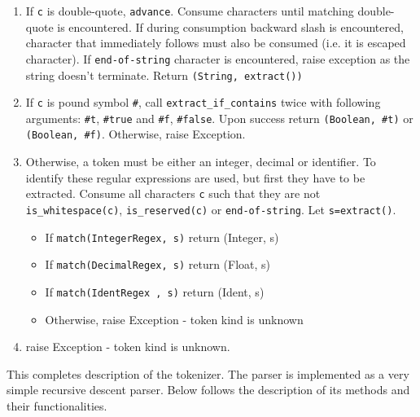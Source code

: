 \begin{itemize}
\begin{enumerate}
	\item
	If \texttt{c} is double-quote, \texttt{advance}. Consume characters until matching double-quote is encountered. If during consumption backward slash is encountered, character that immediately follows must also be consumed (i.e. it is escaped character). If \texttt{end-of-string} character is encountered, raise exception as the string doesn't terminate. Return \texttt{(String, extract())}

	\item
	If \texttt{c} is pound symbol \texttt{\#}, call \texttt{extract\_if\_contains} twice with following arguments: \texttt{\#t}, \texttt{\#true} and \texttt{\#f}, \texttt{\#false}. Upon success return \texttt{(Boolean, \#t)} or \texttt{(Boolean, \#f)}. Otherwise, raise Exception.

	\item
	Otherwise, a token must be either an integer, decimal or identifier. To identify these regular expressions are used, but first they have to be extracted. Consume all characters \texttt{c} such that they are not \texttt{is\_whitespace(c)}, \texttt{is\_reserved(c)} or \texttt{end-of-string}. Let \texttt{s=extract()}. 
	\begin{itemize}
		\item
		If \texttt{match(IntegerRegex, s)} return (Integer, s)
		\item
		If \texttt{match(DecimalRegex, s)} return (Float, s)
		\item
		If \texttt{match(IdentRegex  , s)} return (Ident, s)
		\item
		Otherwise, raise Exception - token kind is unknown


	\end{itemize}
	\item
	raise Exception - token kind is unknown.
\end{enumerate}
\end{itemize}

This completes description of the tokenizer. The parser is implemented as a very simple recursive descent parser. Below follows the description of its methods and their functionalities.

